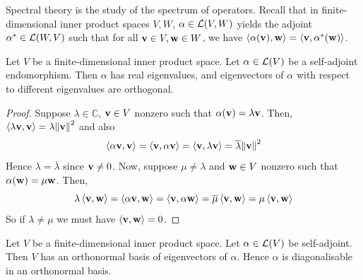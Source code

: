 \documentclass[a4paper]{article}
\begin{document}
Spectral theory is the study of the spectrum of operators.
Recall that in finite-dimensional inner product spaces \( V, W \), \( \alpha \in {\mathcal{L}}(V, W) \) yields the adjoint \( \alpha^* \in {\mathcal{L}}(W, V) \) such that for all \( {\bf v} \in V, {\bf w} \in W \), we have \( \left\langle{\alpha({\bf v}), {\bf w}}\right\rangle = \left\langle{{\bf v}, \alpha^*({\bf w})}\right\rangle \).
\begin{lemma}
	Let \( V \) be a finite-dimensional inner product space.
	Let \( \alpha \in {\mathcal{L}}(V) \) be a self-adjoint endomorphism.
	Then \( \alpha \) has real eigenvalues, and eigenvectors of \( \alpha \) with respect to different eigenvalues are orthogonal.
\end{lemma}
\begin{proof}
	Suppose \( \lambda \in \mathbb C \), \( {\bf v} \in V \) nonzero such that \( \alpha({\bf v}) = \lambda {\bf v} \).
	Then, \( \left\langle{\lambda {\bf v}, {\bf v}}\right\rangle = \lambda \norm{{\bf v}}^2 \) and also
	\[
		\left\langle{\alpha {\bf v}, {\bf v}}\right\rangle = \left\langle{{\bf v}, \alpha {\bf v}}\right\rangle = \left\langle{{\bf v}, \lambda {\bf v}}\right\rangle = \overline{\lambda} \norm{{\bf v}}^2
	\]
	Hence \( \lambda = \overline{\lambda} \) since \( {\bf v} \neq 0 \).
	Now, suppose \( \mu \neq \lambda \) and \( {\bf w} \in V \) nonzero such that \( \alpha({\bf w}) = \mu {\bf w} \).
	Then,
	\[
		\lambda \left\langle{{\bf v}, {\bf w}}\right\rangle = \left\langle{\alpha {\bf v}, {\bf w}}\right\rangle = \left\langle{{\bf v}, \alpha {\bf w}}\right\rangle = \overline{\mu} \left\langle{{\bf v}, {\bf w}}\right\rangle = \mu \left\langle{{\bf v},{\bf w}}\right\rangle
	\]
	So if \( \lambda \neq \mu \) we must have \( \left\langle{{\bf v},{\bf w}}\right\rangle = 0 \).
\end{proof}
\begin{theorem}
	Let \( V \) be a finite-dimensional inner product space.
	Let \( \alpha \in {\mathcal{L}}(V) \) be self-adjoint.
	Then \( V \) has an orthonormal basis of eigenvectors of \( \alpha \).
	Hence \( \alpha \) is diagonalisable in an orthonormal basis.
\end{theorem}
\end{document}
